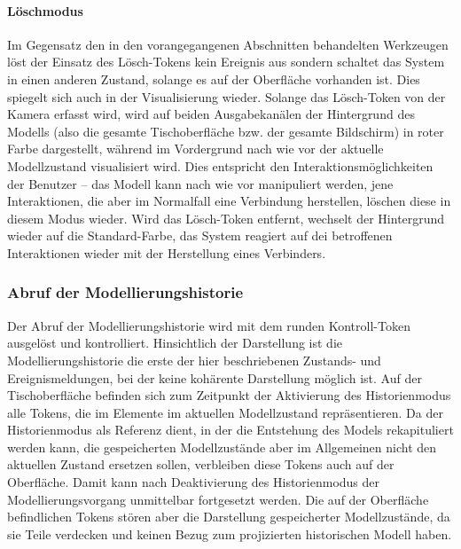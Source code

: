\paragraph{Löschmodus}

Im Gegensatz den in den vorangegangenen Abschnitten behandelten Werkzeugen löst der Einsatz des Lösch-Tokens kein Ereignis aus sondern schaltet das System in einen anderen Zustand, solange es auf der Oberfläche vorhanden ist. Dies spiegelt sich auch in der Visualisierung wieder. Solange das Lösch-Token von der Kamera erfasst wird, wird auf beiden Ausgabekanälen der Hintergrund des Modells (also die gesamte Tischoberfläche bzw. der gesamte Bildschirm) in roter Farbe dargestellt, während im Vordergrund nach wie vor der aktuelle Modellzustand visualisiert wird. Dies entspricht den Interaktionsmöglichkeiten der Benutzer -- das Modell kann nach wie vor manipuliert werden, jene Interaktionen, die aber im Normalfall eine Verbindung herstellen, löschen diese in diesem Modus wieder. Wird das Lösch-Token entfernt, wechselt der Hintergrund wieder auf die Standard-Farbe, das System reagiert auf dei betroffenen Interaktionen wieder mit der Herstellung eines Verbinders.


\subsubsection{Abruf der Modellierungshistorie} %
\label{ssub:abruf_der_modellierungshistorie}

Der Abruf der Modellierungshistorie wird mit dem runden Kontroll-Token ausgelöst und kontrolliert. Hinsichtlich der Darstellung ist die Modellierungshistorie die erste der hier beschriebenen Zustands- und Ereignismeldungen, bei der keine kohärente Darstellung möglich ist. Auf der Tischoberfläche befinden sich zum Zeitpunkt der Aktivierung des Historienmodus alle Tokens, die im Elemente im aktuellen Modellzustand repräsentieren. Da der Historienmodus als Referenz dient, in der die Entstehung des Models rekapituliert werden kann, die gespeicherten Modellzustände aber im Allgemeinen nicht den aktuellen Zustand ersetzen sollen, verbleiben diese Tokens auch auf der Oberfläche. Damit kann nach Deaktivierung des Historienmodus der Modellierungsvorgang unmittelbar fortgesetzt werden. Die auf der Oberfläche befindlichen Tokens stören aber die Darstellung gespeicherter Modellzustände, da sie Teile verdecken und keinen Bezug zum projizierten historischen Modell haben.

